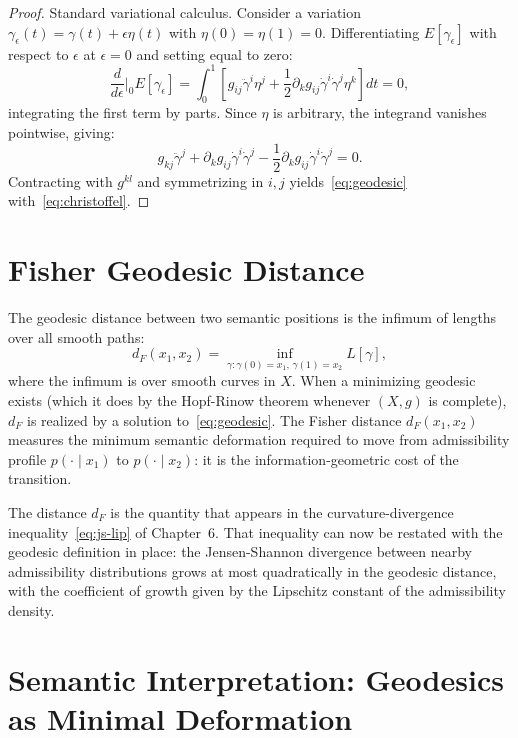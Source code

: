 \documentclass[12pt, oneside]{book}
\theoremstyle{plain-flyxion}
\theoremstyle{definition-flyxion}
\begin{document}
\begin{proof}
Standard variational calculus. Consider a variation $\gamma_\epsilon(t) = \gamma(t) +
\epsilon \eta(t)$ with $\eta(0) = \eta(1) = 0$. Differentiating $E[\gamma_\epsilon]$
with respect to $\epsilon$ at $\epsilon = 0$ and setting equal to zero:
\[
\frac{d}{d\epsilon}\bigg|_0 E[\gamma_\epsilon]
= \int_0^1 \left[g_{ij}\ddot\gamma^i \eta^j
+ \frac{1}{2}\partial_k g_{ij} \dot\gamma^i\dot\gamma^j \eta^k\right] dt = 0,
\]
integrating the first term by parts. Since $\eta$ is arbitrary, the integrand vanishes
pointwise, giving:
\[
g_{kj}\ddot\gamma^j + \partial_k g_{ij}\dot\gamma^i\dot\gamma^j
- \frac{1}{2}\partial_k g_{ij}\dot\gamma^i\dot\gamma^j = 0.
\]
Contracting with $g^{kl}$ and symmetrizing in $i,j$ yields~\eqref{eq:geodesic}
with~\eqref{eq:christoffel}.
\end{proof}

\section{Fisher Geodesic Distance}

The geodesic distance between two semantic positions is the infimum of lengths over all
smooth paths:
\begin{equation}\label{eq:fisher-dist}
d_F(x_1, x_2) = \inf_{\gamma: \gamma(0)=x_1,\, \gamma(1)=x_2} L[\gamma],
\end{equation}
where the infimum is over smooth curves in $X$. When a minimizing geodesic exists (which
it does by the Hopf-Rinow theorem whenever $(X,g)$ is complete), $d_F$ is realized by a
solution to~\eqref{eq:geodesic}. The Fisher distance $d_F(x_1, x_2)$ measures the
minimum semantic deformation required to move from admissibility profile $p(\cdot\mid
x_1)$ to $p(\cdot\mid x_2)$: it is the information-geometric cost of the transition.

The distance $d_F$ is the quantity that appears in the curvature-divergence
inequality~\eqref{eq:js-lip} of Chapter~6. That inequality can now be restated with the
geodesic definition in place: the Jensen-Shannon divergence between nearby admissibility
distributions grows at most quadratically in the geodesic distance, with the coefficient
of growth given by the Lipschitz constant of the admissibility density.

\section{Semantic Interpretation: Geodesics as Minimal Deformation}
\end{document}

